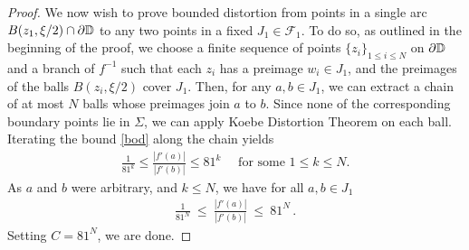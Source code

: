 \documentclass[11pt,reqno]{amsart}
\newcommand{\D}{{\Bbb D}}
\newcommand{\0}{\mathbf{0}}
\theoremstyle{remark}
\numberwithin{equation}{section}
\theoremstyle{remark}
\numberwithin{equation}{section}
\begin{document}
\begin{proof}
We now wish to prove bounded distortion from points in a single arc $B(z_1,\xi/2)\cap \partial\D$ to any two points in a fixed $J_1 \in \mathcal{F}_1$. To do so, as outlined in the beginning of the proof, we choose a finite sequence of points $\{z_i\}_{1 \leq i \leq N}$ on $\partial\D$ and a branch of $f^{-1}$ such that each $z_i$ has a preimage $w_i \in J_1$, and the preimages of the balls $B(z_i,\xi/2)$ cover $J_1$. Then, for any $a,b \in J_1$, we can extract a chain of at most $N$  balls whose preimages join $a$ to $b$. Since none of the corresponding boundary points lie in $\Sigma$, we can apply Koebe Distortion Theorem on each ball. Iterating the bound \eqref{bod} along the chain yields
\begin{eqnarray*}
      \frac{1}{81^k} \leq \frac{|f'(a)|}{|f'(b)|} \leq 81^k \quad \text{ \ for some \ } 1 \leq k \leq N .
\end{eqnarray*}
As $a$ and $b$ were arbitrary, and $k \leq N$, we have for all $a,b \in J_1$
\begin{eqnarray*}
    \frac{1}{81^N} \: \leq \: \frac{|f'(a)|}{|f'(b)|}\:  \leq \: 81^N \, .
\end{eqnarray*}
Setting $C=81^N$, we are done.
\end{proof}
\end{document}
